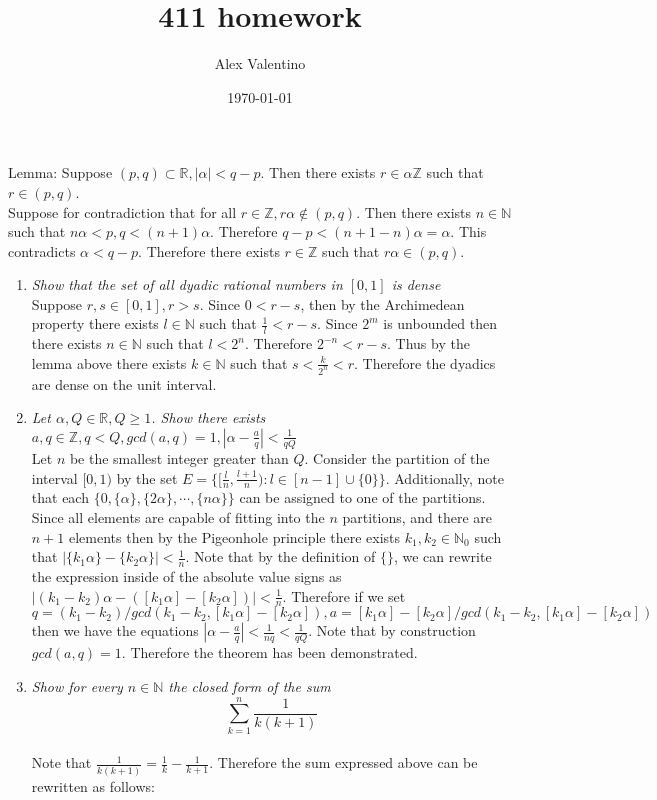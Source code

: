 \documentclass[12pt, letterpaper]{article}
\date{\today}
\author{Alex Valentino}
\title{411 homework}
\newcommand{\Z}{\mathbb{Z}}
\newcommand{\N}{\mathbb{N}}
\newcommand{\R}{\mathbb{R}}
\begin{document}
Lemma: Suppose $(p,q) \subset \R, |\alpha| < q - p$.  Then there exists $r \in \alpha \Z$ such that $r \in (p,q)$.\\  Suppose for contradiction that for all $r \in \Z, r\alpha \not \in (p,q)$.  Then there exists $n \in \N$ such that $n\alpha < p, q <(n+1)\alpha$.  Therefore $q-p < (n+1-n)\alpha = \alpha $.  This contradicts $\alpha < q-p$.  Therefore there exists $r \in \Z$ such that $r \alpha \in (p,q)$.  
\begin{enumerate}
	\item \textit{Show that the set of all dyadic rational numbers in $[0,1]$ is dense}\\
	Suppose $r,s \in [0,1], r > s$.  Since $0 < r-s$, then by the Archimedean property there exists $l \in \N$ such that $\frac{1}{l} < r-s.$  Since $2^m$ is unbounded then there exists $n \in \N$ such that $l < 2^n$.  Therefore $2^{-n} < r - s$.  Thus by the lemma above there exists $k \in \N$ such that $s < \frac{k}{2^n} < r$.  Therefore the dyadics are dense on the unit interval.
	\item \textit{Let $\alpha, Q \in \R, Q \geq 1$.  Show there exists $a,q \in \Z, q < Q, gcd(a,q) = 1, |\alpha - \frac{a}{q}| < \frac{1}{qQ}$}\\
	Let $n$ be the smallest integer greater than $Q$.  Consider the partition of the interval $[0,1)$ by the set $E = \{[\frac{l}{n}, \frac{l+1}{n}) : l \in [n-1]\cup \{0\}\}$.  Additionally, note that each $\{0,\{\alpha\}, \{2\alpha\},\cdots, \{n\alpha\}\}$ can be assigned to one of the partitions.  Since all elements are capable of fitting into the $n$ partitions, and there are $n+1$ elements then by the Pigeonhole principle there exists $k_1, k_2 \in \N_0$ such that $|\{k_1\alpha\}-\{k_2\alpha\}| < \frac{1}{n}$.  Note that by the definition of $\{\}$, we can rewrite the expression inside of the absolute value signs as $|(k_1 - k_2)\alpha - ([k_1\alpha] - [k_2\alpha])| < \frac{1}{n}$.  Therefore if we set $q=(k_1-k_2)/gcd(k_1-k_2, [k_1\alpha] - [k_2\alpha]), a = [k_1\alpha] - [k_2\alpha]/gcd(k_1-k_2, [k_1\alpha] - [k_2\alpha])$ then we have the equations $|\alpha - \frac{a}{q}| < \frac{1}{nq} < \frac{1}{qQ}$.  Note that by construction $gcd(a,q) = 1$.  Therefore the theorem has been demonstrated. 
	\item \textit{Show for every $n \in \N$ the closed form of the sum
	$$
	\displaystyle \sum_{k=1}^n \frac{1}{k(k+1)}
	$$}\\
	Note that $\frac{1}{k(k+1)} = \frac{1}{k} - \frac{1}{k+1}$.   
	Therefore the sum expressed above can be rewritten as follows:

\end{enumerate}
\end{document}
